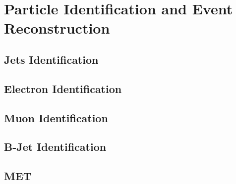 \chapter[Particle Identification and Event Reconstruction]{Particle Identification and Event Reconstruction}
\label{chap:ParticleID}

\section{Jets Identification}
\label{sec:Jet}



\section{Electron Identification}
\label{sec:Electron}



\section{Muon Identification}
\label{sec:Muon}

\section{B-Jet Identification}
\label{sec:BJet}

\section{MET}
\label{sec:MET}

